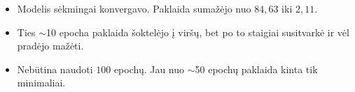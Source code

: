 \begin{itemize}
    \item Modelis sėkmingai konvergavo. Paklaida sumažėjo nuo $84{,}63$ iki $2{,}11$.
    \item Ties $\sim$10 epocha paklaida šoktelėjo į viršų, bet po to staigiai susitvarkė ir vėl pradėjo mažėti.
    \item Nebūtina naudoti $100$ epochų. Jau nuo $\sim$50 epochų paklaida kinta tik minimaliai.
\end{itemize}